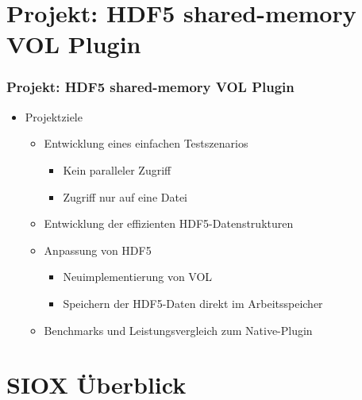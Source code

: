 \section{Projekt: HDF5 shared-memory VOL Plugin}
\begin{frame}
	\frametitle{Projekt: HDF5 shared-memory VOL Plugin}

	\begin{itemize}
		\item Projektziele
		\begin{itemize}
			\item Entwicklung eines einfachen Testszenarios
			\begin{itemize}
				\item Kein paralleler Zugriff
				\item Zugriff nur auf eine Datei
			\end{itemize}
			\item Entwicklung der effizienten HDF5-Datenstrukturen
			\item Anpassung von HDF5
			\begin{itemize}
				\item Neuimplementierung von VOL
				\item Speichern der HDF5-Daten direkt im Arbeitsspeicher
			\end{itemize}
			\item Benchmarks und Leistungsvergleich zum Native-Plugin
		\end{itemize}
	\end{itemize}
\end{frame}



\section{SIOX Überblick}

